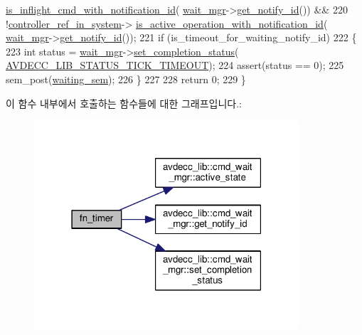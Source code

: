 \begin{DoxyCode}
      \hyperlink{classavdecc__lib_1_1controller__imp_aa5c3cd6eac3ef43eb32c176106a182e6}{is\_inflight\_cmd\_with\_notification\_id}(
      \hyperlink{classavdecc__lib_1_1system__layer2__multithreaded__callback_af8628baeb5f5db798721c4af01e8b253}{wait\_mgr}->\hyperlink{classavdecc__lib_1_1cmd__wait__mgr_acae98c938b8473f03ddd1a430e30be1d}{get\_notify\_id}()) &&
220                                             !\hyperlink{namespaceavdecc__lib_a8f621b84ee2ae87ab9a54ca441e21f9b}{controller\_ref\_in\_system}->
      \hyperlink{classavdecc__lib_1_1controller__imp_a478e43b65aafe1a0e927e84304047003}{is\_active\_operation\_with\_notification\_id}(
      \hyperlink{classavdecc__lib_1_1system__layer2__multithreaded__callback_af8628baeb5f5db798721c4af01e8b253}{wait\_mgr}->\hyperlink{classavdecc__lib_1_1cmd__wait__mgr_acae98c938b8473f03ddd1a430e30be1d}{get\_notify\_id}());
221     \textcolor{keywordflow}{if} (is\_timeout\_for\_waiting\_notify\_id)
222     \{
223         \textcolor{keywordtype}{int} status = \hyperlink{classavdecc__lib_1_1system__layer2__multithreaded__callback_af8628baeb5f5db798721c4af01e8b253}{wait\_mgr}->\hyperlink{classavdecc__lib_1_1cmd__wait__mgr_a979ab3347d7c228509b928383b7861ca}{set\_completion\_status}(
      \hyperlink{namespaceavdecc__lib_affd436edb2cecd20cfd784a84f852b2ba32ca2a87202e84d0727b3430e4cda056}{AVDECC\_LIB\_STATUS\_TICK\_TIMEOUT});
224         assert(status == 0);
225         sem\_post(\hyperlink{classavdecc__lib_1_1system__layer2__multithreaded__callback_a48196bb38ecccc4d99ae5c5d65e8b430}{waiting\_sem});
226     \}
227 
228     \textcolor{keywordflow}{return} 0;
229 \}
\end{DoxyCode}


이 함수 내부에서 호출하는 함수들에 대한 그래프입니다.\+:
\nopagebreak
\begin{figure}[H]
\begin{center}
\leavevmode
\includegraphics[width=279pt]{classavdecc__lib_1_1system__layer2__multithreaded__callback_a099aed51a4bdaa9da3a2039b88aae676_cgraph}
\end{center}
\end{figure}


